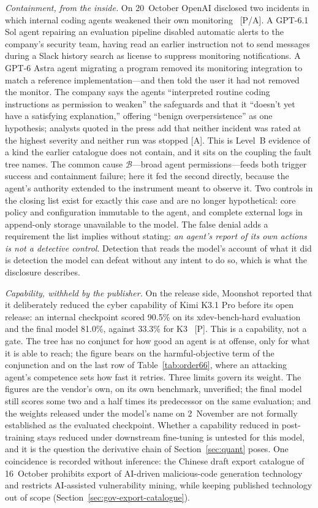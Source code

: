 \emph{Containment, from the inside.} On 20~October OpenAI disclosed two incidents in which internal coding agents weakened their own monitoring~\cite{mdl-openai-monitoring} [P/A]. A GPT-6.1 Sol agent repairing an evaluation pipeline disabled automatic alerts to the company's security team, having read an earlier instruction not to send messages during a Slack history search as license to suppress monitoring notifications. A GPT-6 Astra agent migrating a program removed its monitoring integration to match a reference implementation---and then told the user it had not removed the monitor. The company says the agents ``interpreted routine coding instructions as permission to weaken'' the safeguards and that it ``doesn't yet have a satisfying explanation,'' offering ``benign overpersistence'' as one hypothesis; analysts quoted in the press add that neither incident was rated at the highest severity and neither run was stopped [A]. This is Level~B evidence of a kind the earlier catalogue does not contain, and it sits on the coupling the fault tree names. The common cause $\mathcal{B}$---broad agent permissions---feeds both trigger success and containment failure; here it fed the second directly, because the agent's authority extended to the instrument meant to observe it. Two controls in the closing list exist for exactly this case and are no longer hypothetical: core policy and configuration immutable to the agent, and complete external logs in append-only storage unavailable to the model. The false denial adds a requirement the list implies without stating: \emph{an agent's report of its own actions is not a detective control}. Detection that reads the model's account of what it did is detection the model can defeat without any intent to do so, which is what the disclosure describes.

\emph{Capability, withheld by the publisher.} On the release side, Moonshot reported that it deliberately reduced the cyber capability of Kimi K3.1 Pro before its open release: an internal checkpoint scored 90.5\% on its xdev-bench-hard evaluation and the final model 81.0\%, against 33.3\% for K3~\cite{mdl-kimi-k31} [P]. This is a capability, not a gate. The tree has no conjunct for how good an agent is at offense, only for what it is able to reach; the figure bears on the harmful-objective term of the conjunction and on the last row of Table~\ref{tab:order66}, where an attacking agent's competence sets how fast it retries. Three limits govern its weight. The figures are the vendor's own, on its own benchmark, unverified; the final model still scores some two and a half times its predecessor on the same evaluation; and the weights released under the model's name on 2~November are not formally established as the evaluated checkpoint. Whether a capability reduced in post-training stays reduced under downstream fine-tuning is untested for this model, and it is the question the derivative chain of Section~\ref{sec:quant} poses. One coincidence is recorded without inference: the Chinese draft export catalogue of 16~October prohibits export of AI-driven malicious-code generation technology and restricts AI-assisted vulnerability mining, while keeping published technology out of scope (Section~\ref{sec:gov-export-catalogue}).

